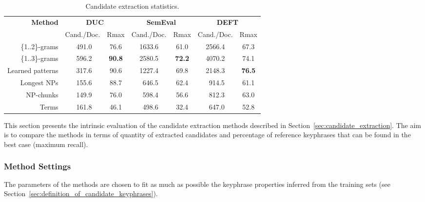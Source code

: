    \begin{table*}
      \centering
      \begin{tabular}{@{~}rcccccc@{~}}
        \toprule
        \multirow{2}{*}[-2pt]{\textbf{Method}} & \multicolumn{2}{c}{\textbf{DUC}} & \multicolumn{2}{c}{\textbf{SemEval}} & \multicolumn{2}{c}{\textbf{DEFT}}\\
        \cmidrule(r){2-3}\cmidrule(lr){4-5}\cmidrule(l){6-7}
        & Cand./Doc. & Rmax & Cand./Doc. & Rmax & Cand./Doc. & Rmax\\
        \midrule
        \{1..2\}-grams & $~~$491.0 & 76.6 & 1633.6 & 61.0 & 2566.4 & 67.3\\
        \{1..3\}-grams & $~~$596.2 & \textbf{90.8} & 2580.5 & \textbf{72.2} & 4070.2 & 74.1\\
        Learned patterns & $~~$317.6 & 90.6 & 1227.4 & 69.8 & 2148.3 & \textbf{76.5}\\
        Longest NPs & $~~$155.6 & 88.7 & $~~$646.5 & 62.4 & $~~$914.5 & 61.1\\
        NP-chunks & $~~$149.9 & 76.0 & $~~$598.4 & 56.6 & $~~$812.3 & 63.0\\
        Terms & $~~$161.8 & 46.1 & $~~$498.6 & 32.4 & $~~$647.0 & 52.8\\
        \bottomrule
      \end{tabular}
      \caption{Candidate extraction statistics.
               \label{tab:candidate_extraction_statistics}}
    \end{table*}

    This section presents the intrinsic evaluation of the candidate extraction
    methods described in Section~\ref{sec:candidate_extraction}. The aim is to
    compare the methods in terms of quantity of extracted candidates and
    percentage of reference keyphrases that can be found in the best case
    (maximum recall).

    \subsubsection{Method Settings}
    \label{subsubsec:method_settings}
      The parameters of the methods are chosen to fit as much as possible the
      keyphrase properties inferred from the training sets (see
      Section~\ref{sec:definition_of_candidate_keyphrases}).

